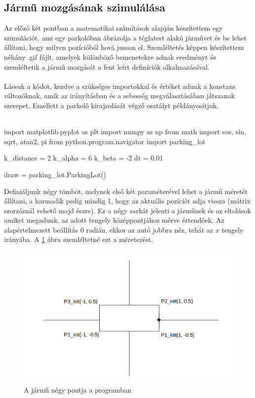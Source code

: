 \subsection{Jármű mozgásának szimulálása}

Az előző két pontban a matematikai számítások alapján készítettem egy szimulációt, ami egy parkolóban ábrázolja a téglatest alakú járművet és be lehet állítani, hogy milyen pozícióból hová jusson el. Szemléltetés képpen készítettem néhány .gif fájlt, amelyek különböző bemenetekre adnak eredményt és szemléltetik a jármű mozgását a fent leírt definíciók alkalmazásával.
\\\\
Lássuk a kódot, kezdve a szükséges importokkal és értéket adunk a konstans változóknak, amik az irányításban és a sebesség megválasztásában játszanak szerepet. Emellett a parkoló kirajzolását végző osztályt példányosítjuk.
\\\\

\begin{python}
import matplotlib.pyplot as plt
import numpy as np
from math import cos, sin, sqrt, atan2, pi
from python.program.navigator import parking_lot

k_distance = 2
k_alpha = 6
k_beta = -2
dt = 0.01

draw = parking_lot.ParkingLot()
\end{python}

\bigskip
\bigskip

Definiáljunk négy tömböt, melynek első két paraméterével lehet a jármű méretét állítani, a harmadik pedig mindig 1, hogy az aktuális pozíciót adja vissza (mátrix szorzásnál vehető majd észre). Ez a négy sarkát jelenti a járműnek és az eltolások amiket megadunk, az adott tengely középpontjához mérve értendőek. Az alapértelmezett beállítás 0 radián, ekkor az autó jobbra néz, tehát az $ x $ tengely irányába. A \ref{fig:vehicle_points} ábra szemléltetné ezt a méretezést.

\begin{figure}[h!]
\centering
\includegraphics[scale=0.70]{images/vehicle_points.png}
\caption{A jármű négy pontja a programban}
\label{fig:vehicle_points}
\end{figure}

